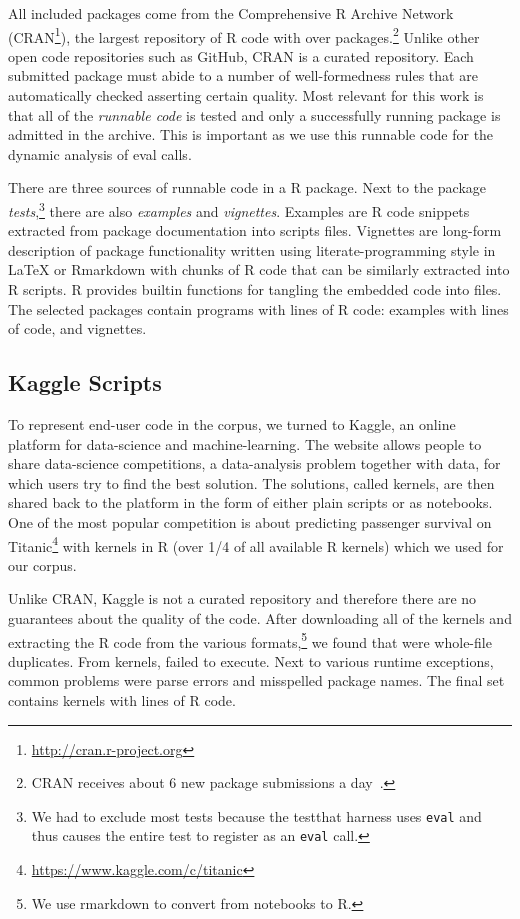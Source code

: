 \documentclass[USenglish,cleveref, autoref, thm-restate]{lipics-v2019}
\newcommand{\eval}{\texttt{eval}\xspace}
\begin{document}
All included packages come from the Comprehensive R Archive Network
(CRAN\footnote{\url{http://cran.r-project.org}}), the largest repository of R
code with over \CorpusAllCranRnd packages.\footnote{CRAN receives about 6 new
  package submissions a day~\cite{Ligges2017}.} Unlike other open code
repositories such as GitHub, CRAN is a curated repository. Each submitted
package must abide to a number of well-formedness rules that are automatically
checked asserting certain quality. Most relevant for this work is that all of
the \emph{runnable code} is tested and only a successfully running package is
admitted in the archive. This is important as we use this runnable code for the
dynamic analysis of eval calls.

There are three sources of runnable code in a R package. Next to the package
\emph{tests},\footnote{We had to exclude most tests because the {testthat}
  harness uses \eval and thus causes the entire test to register as an \eval
  call.} there are also \emph{examples} and \emph{vignettes}. Examples are R
code snippets extracted from package documentation into scripts files.
Vignettes are long-form description of package functionality written using
literate-programming style in \LaTeX\xspace or Rmarkdown with chunks of R
code that can be similarly extracted into R scripts. R provides builtin
functions for tangling the embedded code into files.  The selected packages
contain \CorpusPackagePrograms programs with \CorpusPackageProgramsCodeRnd
lines of R code: \CorpusExamplesProgramsRnd examples with
\CorpusExamplesCodeRnd lines of code, and \CorpusVignettesProgramsRnd
vignettes.

\subsection{Kaggle Scripts}

To represent end-user code in the corpus, we turned to Kaggle, an online
platform for data-science and machine-learning. The website allows people to
share data-science competitions, a data-analysis problem together with data,
for which users try to find the best solution. The solutions, called
{kernels}, are then shared back to the platform in the form of either plain
scripts or as notebooks.  One of the most popular competition is about
predicting passenger survival on
Titanic\footnote{\url{https://www.kaggle.com/c/titanic}} with \CorpusKaggle
kernels in R (over 1/4 of all available R kernels) which we used for our
corpus.

Unlike CRAN, Kaggle is not a curated repository and therefore there are no
guarantees about the quality of the code. After downloading all of the
\CorpusKaggle kernels and extracting the R code from the various
formats,\footnote{We use {\sf rmarkdown} to convert from notebooks to R.} we
found that \CorpusDuplicatedKaggle were whole-file duplicates. From
\CorpusRunnableKaggle kernels, \CorpusFailedKaggle failed to execute. Next
to various runtime exceptions, common problems were parse errors and
misspelled package names.  The final set contains \CorpusFinishedKaggle
kernels with \CorpusFinishedKaggleCodeRnd lines of R code.
\end{document}
